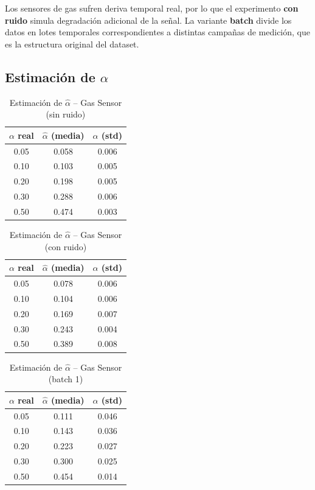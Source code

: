 \documentclass[a4paper,11pt]{article}
\begin{document}
Los sensores de gas sufren deriva temporal real, por lo que el experimento \textbf{con ruido} simula degradación adicional de la señal. La variante \textbf{batch} divide los datos en lotes temporales correspondientes a distintas campañas de medición, que es la estructura original del dataset.

\subsection{Estimación de $\alpha$}

\begin{table}[H]
\centering
\caption{Estimación de $\hat{\alpha}$ -- Gas Sensor (sin ruido)}
\begin{tabular}{ccc}
\toprule
$\alpha$ real & $\hat{\alpha}$ (media) & $\hat{\alpha}$ (std) \\
\midrule
0.05 & 0.058 & 0.006 \\
0.10 & 0.103 & 0.005 \\
0.20 & 0.198 & 0.005 \\
0.30 & 0.288 & 0.006 \\
0.50 & 0.474 & 0.003 \\
\bottomrule
\end{tabular}
\end{table}

\begin{table}[H]
\centering
\caption{Estimación de $\hat{\alpha}$ -- Gas Sensor (con ruido)}
\begin{tabular}{ccc}
\toprule
$\alpha$ real & $\hat{\alpha}$ (media) & $\hat{\alpha}$ (std) \\
\midrule
0.05 & 0.078 & 0.006 \\
0.10 & 0.104 & 0.006 \\
0.20 & 0.169 & 0.007 \\
0.30 & 0.243 & 0.004 \\
0.50 & 0.389 & 0.008 \\
\bottomrule
\end{tabular}
\end{table}

\begin{table}[H]
\centering
\caption{Estimación de $\hat{\alpha}$ -- Gas Sensor (batch 1)}
\begin{tabular}{ccc}
\toprule
$\alpha$ real & $\hat{\alpha}$ (media) & $\hat{\alpha}$ (std) \\
\midrule
0.05 & 0.111 & 0.046 \\
0.10 & 0.143 & 0.036 \\
0.20 & 0.223 & 0.027 \\
0.30 & 0.300 & 0.025 \\
0.50 & 0.454 & 0.014 \\
\bottomrule
\end{tabular}
\end{table}
\end{document}
